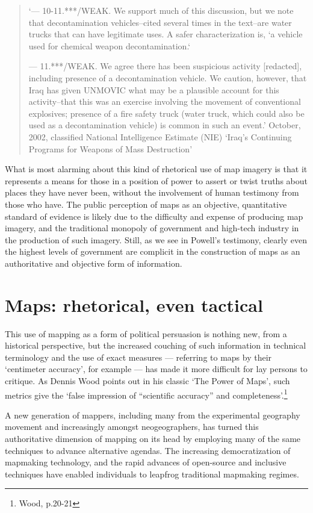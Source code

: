 \documentclass[11pt,oneside,notitlepage]{report}
\begin{document}
\begin{quote}
	`--- 10-11.***/WEAK. We support much of this discussion, but we note that decontamination vehicles--cited several times in the text--are water trucks that can have legitimate uses. A safer characterization is, `a vehicle used for chemical weapon decontamination.`

--- 11.***/WEAK. We agree there has been suspicious activity [redacted], including presence of a decontamination vehicle. We caution, however, that Iraq has given UNMOVIC what may be a plausible account for this activity--that this was an exercise involving the movement of conventional explosives; presence of a fire safety truck (water truck, which could also be used as a decontamination vehicle) is common in such an event.'
	October, 2002, classified National Intelligence Estimate (NIE) `Iraq's Continuing Programs for Weapons of Mass Destruction' \cite{senate2004report}
\end{quote} 

What is most alarming about this kind of rhetorical use of map imagery is that it represents a means for those in a position of power to assert or twist truths about places they have never been, without the involvement of human testimony from those who have. The public perception of maps as an objective, quantitative standard of evidence is likely due to the difficulty and expense of producing map imagery, and the traditional monopoly of government and high-tech industry in the production of such imagery. Still, as we see in Powell's testimony, clearly even the highest levels of government are complicit in the construction of maps as an authoritative and objective form of information.

\section{Maps: rhetorical, even tactical}

This use of mapping as a form of political persuasion is nothing new, from a historical perspective, but the increased couching of such information in technical terminology and the use of exact measures --- referring to maps by their `centimeter accuracy', for example --- has made it more difficult for lay persons to critique. As Dennis Wood points out in his classic `The Power of Maps', such metrics give the `false impression of ``scientific accuracy'' and completeness'.\footnote{Wood, p.20-21} 

A new generation of mappers, including many from the experimental geography movement and increasingly amongst neogeographers, has turned this authoritative dimension of mapping on its head by employing many of the same techniques to advance alternative agendas. The increasing democratization of mapmaking technology, and the rapid advances of open-source and inclusive techniques have enabled individuals to leapfrog traditional mapmaking regimes. 
\end{document}
